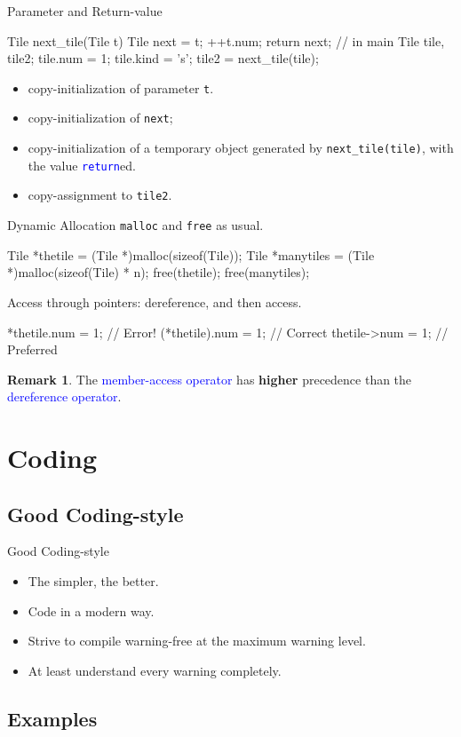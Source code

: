 \documentclass{beamer}
\newcommand{\blue}[1]{\textcolor{blue}{#1}}
\newcommand{\ttt}[1]{\texttt{#1}}
\newcommand{\bluett}[1]{\blue{\ttt{#1}}}
\theoremstyle{definition}
\newtheorem{rmk}{Remark}
\begin{document}
\begin{frame}[fragile]{Parameter and Return-value}
    \begin{cpp}
Tile next_tile(Tile t) {
  Tile next = t;
  ++t.num;
  return next;
}
// in main
Tile tile, tile2;
tile.num = 1; tile.kind = 's';
tile2 = next_tile(tile);
    \end{cpp}
    \begin{itemize}
        \item copy-initialization of parameter \ttt{t}.
        \item copy-initialization of \ttt{next};
        \item copy-initialization of a temporary object generated by \ttt{next\_tile(tile)}, with the value \bluett{return}ed.
        \item copy-assignment to \ttt{tile2}.
    \end{itemize}
\end{frame}

\begin{frame}[fragile]{Dynamic Allocation}
    \ttt{malloc} and \ttt{free} as usual.
    \begin{cpp}
Tile *thetile
  = (Tile *)malloc(sizeof(Tile));
Tile *manytiles
  = (Tile *)malloc(sizeof(Tile) * n);
free(thetile); free(manytiles);
    \end{cpp}
    \pause
    Access through pointers: dereference, and then access.
    \begin{cpp}
*thetile.num = 1;   // Error!
(*thetile).num = 1; // Correct
thetile->num = 1;   // Preferred
    \end{cpp}
    \begin{rmk}
        The \blue{member-access operator} has \textbf{higher} precedence than the \blue{dereference operator}.
    \end{rmk}
\end{frame}

\section{Coding}

\subsection{Good Coding-style}

\begin{frame}{Good Coding-style}
    \begin{itemize}
        \item The simpler, the better.
        \item Code in a modern way.
        \item Strive to compile warning-free at the maximum warning level.
        \item At least understand every warning completely.
    \end{itemize}
\end{frame}

\subsection{Examples}
\end{document}
